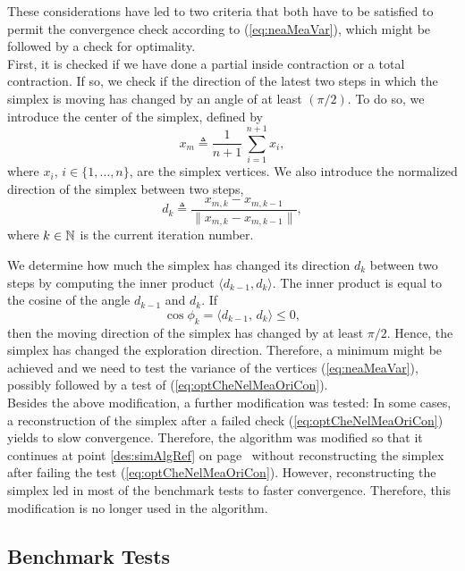 These considerations have led to two criteria that both have to be satisfied to permit the convergence check according to (\ref{eq:neaMeaVar}), which might be followed by a check for optimality.\\

First, it is checked if we have done a partial inside contraction or a total contraction. If so, we 
check if the direction of the latest two steps in which the simplex is moving has changed by an angle of at 
least $(\pi / 2)$. 
To do so, we introduce the center of the simplex, defined by
\begin{equation}
  x_m \triangleq \frac{1}{n+1} \, \sum_{i=1}^{n+1} x_i,
\end{equation}
where $x_i$, $i \in \{ 1, \ldots, n\}$, are the simplex vertices.
We also introduce the normalized direction of the simplex between two steps,
\begin{equation}
  d_k \triangleq \frac{ x_{m, k} - x_{m, k-1} }
{ \| x_{m, k} - x_{m, k-1} \| },
\end{equation}
where $k \in {\mathbb N}$ is the current iteration number.

We determine how much the simplex has changed its direction $d_k$ between two steps by 
computing the inner product $\langle d_{k-1}, d_k \rangle$. 
The inner product is equal to the cosine of the angle $d_{k-1}$ and $d_k$.
If
\begin{equation}
  \cos \phi_k = \langle d_{k-1}, \, d_k \rangle \le 0,
  \label{eq:nelMeaCosMov}
\end{equation}
then the moving direction of the simplex has changed by at least $\pi / 2$.
Hence, the simplex has changed the exploration direction.
Therefore, a minimum might be achieved and we need to test the variance of the 
vertices (\ref{eq:neaMeaVar}), possibly followed by a test of (\ref{eq:optCheNelMeaOriCon}).\\

Besides the above modification, a further modification was tested: 
In some cases, a reconstruction of the simplex after a failed check (\ref{eq:optCheNelMeaOriCon})
yields to slow convergence.
Therefore, the algorithm was modified so that it continues at 
point \ref{des:simAlgRef} on page~\pageref{des:simAlgRef} without reconstructing the simplex after 
failing the test (\ref{eq:optCheNelMeaOriCon}).
However, reconstructing the simplex led in most of the benchmark tests to faster convergence. Therefore, 
this modification is no longer used in the algorithm.

\subsection{Benchmark Tests}
\label{sec:algSimBenTes}

